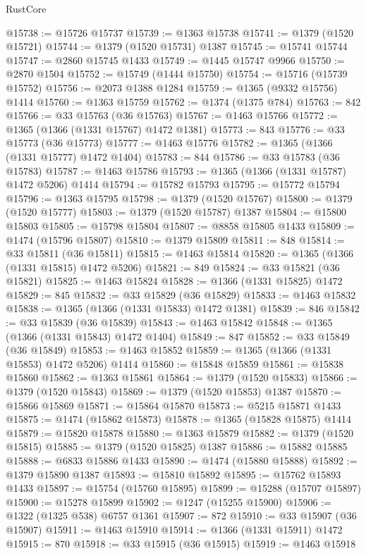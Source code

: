 \begin{lexlean}{RustCore}
\begin{coremodule}
@15738 := @15726 @15737
@15739 := @1363 @15738
@15741 := @1379 (@1520 @15721)
@15744 := @1379 (@1520 @15731) @1387
@15745 := @15741 @15744
@15747 := @2860 @15745 @1433
@15749 := @1445 @15747 @9966
@15750 := @2870 @1504
@15752 := @15749 (@1444 @15750)
@15754 := @15716 (@15739 @15752)
@15756 := @2073 @1388 @1284
@15759 := @1365 (@9332 @15756) @1414
@15760 := @1363 @15759
@15762 := @1374 (@1375 @784)
@15763 := 842
@15766 := @33 @15763 (@36 @15763)
@15767 := @1463 @15766
@15772 := @1365 (@1366 (@1331 @15767) @1472 @1381)
@15773 := 843
@15776 := @33 @15773 (@36 @15773)
@15777 := @1463 @15776
@15782 := @1365 (@1366 (@1331 @15777) @1472 @1404)
@15783 := 844
@15786 := @33 @15783 (@36 @15783)
@15787 := @1463 @15786
@15793 := @1365 (@1366 (@1331 @15787) @1472 @5206) @1414
@15794 := @15782 @15793
@15795 := @15772 @15794
@15796 := @1363 @15795
@15798 := @1379 (@1520 @15767)
@15800 := @1379 (@1520 @15777)
@15803 := @1379 (@1520 @15787) @1387
@15804 := @15800 @15803
@15805 := @15798 @15804
@15807 := @8858 @15805 @1433
@15809 := @1474 (@15796 @15807)
@15810 := @1379 @15809
@15811 := 848
@15814 := @33 @15811 (@36 @15811)
@15815 := @1463 @15814
@15820 := @1365 (@1366 (@1331 @15815) @1472 @5206)
@15821 := 849
@15824 := @33 @15821 (@36 @15821)
@15825 := @1463 @15824
@15828 := @1366 (@1331 @15825) @1472
@15829 := 845
@15832 := @33 @15829 (@36 @15829)
@15833 := @1463 @15832
@15838 := @1365 (@1366 (@1331 @15833) @1472 @1381)
@15839 := 846
@15842 := @33 @15839 (@36 @15839)
@15843 := @1463 @15842
@15848 := @1365 (@1366 (@1331 @15843) @1472 @1404)
@15849 := 847
@15852 := @33 @15849 (@36 @15849)
@15853 := @1463 @15852
@15859 := @1365 (@1366 (@1331 @15853) @1472 @5206) @1414
@15860 := @15848 @15859
@15861 := @15838 @15860
@15862 := @1363 @15861
@15864 := @1379 (@1520 @15833)
@15866 := @1379 (@1520 @15843)
@15869 := @1379 (@1520 @15853) @1387
@15870 := @15866 @15869
@15871 := @15864 @15870
@15873 := @5215 @15871 @1433
@15875 := @1474 (@15862 @15873)
@15878 := @1365 (@15828 @15875) @1414
@15879 := @15820 @15878
@15880 := @1363 @15879
@15882 := @1379 (@1520 @15815)
@15885 := @1379 (@1520 @15825) @1387
@15886 := @15882 @15885
@15888 := @6833 @15886 @1433
@15890 := @1474 (@15880 @15888)
@15892 := @1379 @15890 @1387
@15893 := @15810 @15892
@15895 := @15762 @15893 @1433
@15897 := @15754 (@15760 @15895)
@15899 := @15288 (@15707 @15897)
@15900 := @15278 @15899
@15902 := @1247 (@15255 @15900)
@15906 := @1322 (@1325 @538) @6757 @1361
@15907 := 872
@15910 := @33 @15907 (@36 @15907)
@15911 := @1463 @15910
@15914 := @1366 (@1331 @15911) @1472
@15915 := 870
@15918 := @33 @15915 (@36 @15915)
@15919 := @1463 @15918

\end{coremodule}
\end{lexlean}
